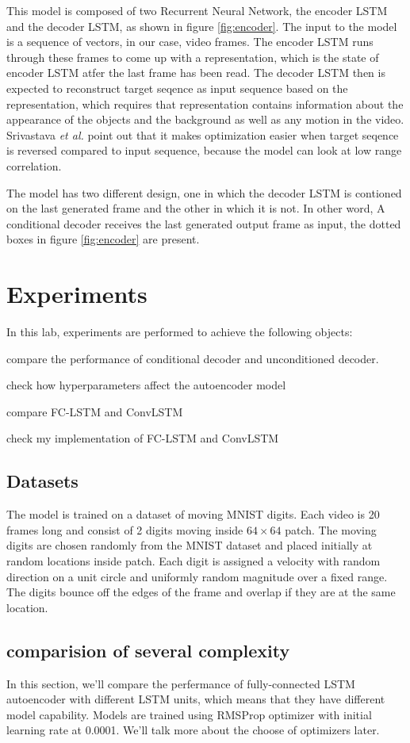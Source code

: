 \documentclass[twoside,a4paper,article]{combine}
\begin{document}
This model is composed of two Recurrent Neural Network, the encoder LSTM and the decoder LSTM, as shown in figure \ref{fig:encoder}.
The input to the model is a sequence of vectors, in our case, video frames. The encoder LSTM runs through these frames to come up with a
representation, which is the state of encoder LSTM atfer the last frame has been read. The decoder LSTM then is expected to reconstruct
target seqence as input sequence based on the representation, which requires that representation contains information about the
appearance of the objects and the background as well as any motion in the video. Srivastava \emph{et al.} point out that it makes
optimization easier when target seqence is reversed compared to input sequence, because the model can look at low range correlation. 

The model has two different design, one in which the decoder LSTM is contioned on the last generated frame and the other in which it is
not. In other word, A conditional decoder receives the last generated output frame as input, the dotted boxes in figure 
\ref{fig:encoder} are present.

\section{Experiments}
In this lab, experiments are performed to achieve the following objects:

compare the performance of conditional decoder and unconditioned decoder.

check how hyperparameters affect the autoencoder model

compare FC-LSTM and ConvLSTM 

check my implementation of FC-LSTM and ConvLSTM
\subsection{Datasets}
The model is trained on a dataset of moving MNIST digits. Each video is 20 frames long and consist of 2 digits moving inside $64\times64$
patch. The moving digits are chosen randomly from the MNIST dataset and placed initially at random locations inside patch. Each digit is
assigned a velocity with random direction on a unit circle and uniformly random magnitude over a fixed range. The digits bounce off the 
edges of the frame and overlap if they are at the same location.

\subsection{comparision of several complexity}
In this section, we'll compare the perfermance of fully-connected LSTM autoencoder with different LSTM units, which means that they have
different model capability. Models are trained using RMSProp optimizer with initial learning rate at 0.0001. We'll talk more about the
choose of optimizers later.
\end{document}
